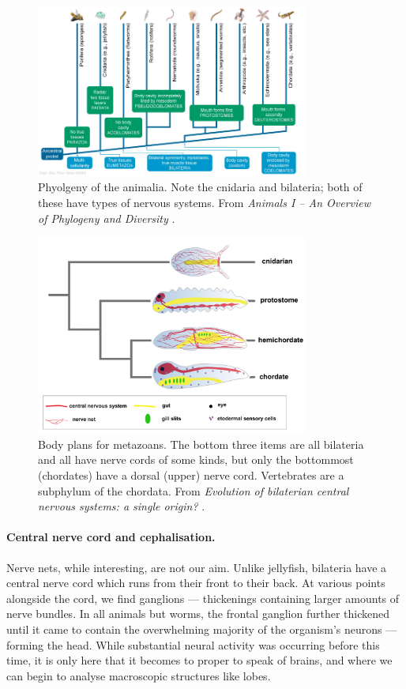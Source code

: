 \begin{figure}
	\centering
	\includegraphics[width=0.8\textwidth]{Figs/animalia.jpg}
	\caption{Phyolgeny of the animalia. Note the cnidaria and bilateria; both of these have types of nervous systems. From {\em Animals I -- An Overview of Phylogeny and Diversity} \cite{animalia}.}
	\label{fig:animalia}
\end{figure}

\begin{figure}
	\centering
	\includegraphics[width=0.8\textwidth]{Figs/chordata.jpg}
	\caption{Body plans for metazoans. The bottom three items are all bilateria and all have nerve cords of some kinds, but only the bottommost (chordates) have a dorsal (upper) nerve cord. Vertebrates are a subphylum of the chordata. From {\em Evolution of bilaterian central nervous systems: a single origin?} \cite[p. 3]{chordata}.}
	\label{fig:chordata}
\end{figure}

\paragraph{Central nerve cord and cephalisation.} Nerve nets, while interesting, are not our aim. Unlike jellyfish, bilateria have a central nerve cord which runs from their front to their back. At various points alongside the cord, we find ganglions --- thickenings containing larger amounts of nerve bundles. In all animals but worms, the frontal ganglion further thickened until it came to contain the overwhelming majority of the organism's neurons --- forming the head. While substantial neural activity was occurring before this time, it is only here that it becomes to proper to speak of brains, and where we can begin to analyse macroscopic structures like lobes.

